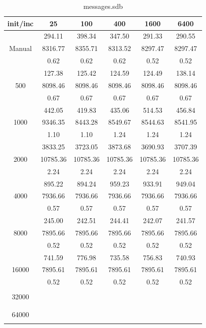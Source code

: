 {\begin{table}[th]
\centering
\begin{tabular}{|c||c|c|c|c|c|}
\hline
init/inc & 25 & 100 & 400 & 1600 & 6400 \\ \hline \hline
       & 294.11     & 398.34   & 347.50   & 291.33   & 290.55 \\
Manual & 8316.77    & 8355.71  & 8313.52  & 8297.47  & 8297.47 \\
       & 0.62       & 0.62     & 0.62     & 0.52     & 0.52 \\ \hline
  & 127.38 & 125.42 & 124.59 & 124.49 & 138.14\\ 
500  & 8098.46 & 8098.46 & 8098.46 & 8098.46 & 8098.46\\ 
  & 0.67 & 0.67 & 0.67 & 0.67 & 0.67\\ \hline 
  & 442.05 & 419.83 & 435.06 & 514.53 & 456.84\\ 
1000  & 9346.35 & 8443.28 & 8549.67 & 8544.63 & 8541.95\\ 
  & 1.10 & 1.10 & 1.24 & 1.24 & 1.24\\ \hline 
  & 3833.25 & 3723.05 & 3873.68 & 3690.93 & 3707.39\\ 
2000  & 10785.36 & 10785.36 & 10785.36 & 10785.36 & 10785.36\\ 
  & 2.24 & 2.24 & 2.24 & 2.24 & 2.24\\ \hline 
  & 895.22 & 894.24 & 959.23 & 933.91 & 949.04\\ 
4000  & 7936.66 & 7936.66 & 7936.66 & 7936.66 & 7936.66\\ 
  & 0.57 & 0.57 & 0.57 & 0.57 & 0.57\\ \hline 
  & 245.00 & 242.51 & 244.41 & 242.07 & 241.57\\ 
8000  & 7895.66 & 7895.66 & 7895.66 & 7895.66 & 7895.66\\ 
  & 0.52 & 0.52 & 0.52 & 0.52 & 0.52\\ \hline 
  & 741.59 & 776.98 & 735.58 & 756.83 & 740.93\\ 
16000  & 7895.61 & 7895.61 & 7895.61 & 7895.61 & 7895.61\\ 
  & 0.52 & 0.52 & 0.52 & 0.52 & 0.52\\ \hline 
  &  &  &  &  & \\ 
32000  &  &  &  &  & \\ 
  &  &  &  &  & \\ \hline 
  &  &  &  &  & \\ 
64000  &  &  &  &  & \\ 
  &  &  &  &  & \\ \hline 
\end{tabular}
\caption{messages.sdb}
\label{tab:messages.sdb}
\end{table}

}
